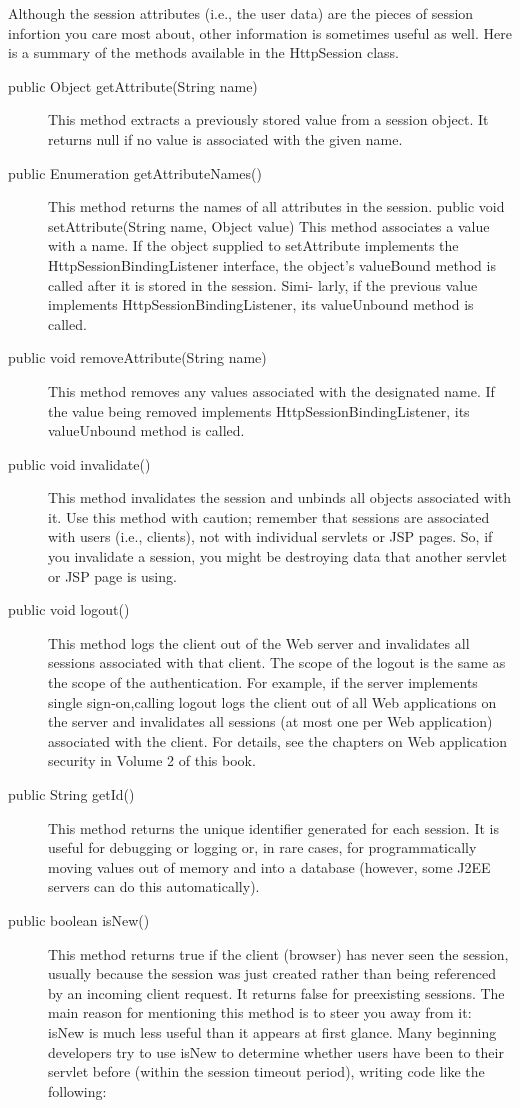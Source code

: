 \documentclass[a4paper,10pt]{scrreprt}
\begin{document}
{ Although the session attributes (i.e., the user data) are the pieces of session infortion you care most about, other
information is sometimes useful as well. Here is a summary of the methods available in the HttpSession class.
\begin{description}
\item[public Object getAttribute(String name)] This method extracts a previously stored value from a session object. It 
returns null if no value is associated with the
given name.
\item [public Enumeration getAttributeNames()]This method returns the names of all attributes in the session.
public void setAttribute(String name, Object value)
This method associates a value with a name. If the object supplied to setAttribute implements the
HttpSessionBindingListener interface, the object’s valueBound method is called after it is stored in the session.
Simi- larly, if the previous value implements HttpSessionBindingListener, its valueUnbound method is called.
\item[public void removeAttribute(String name)] This method removes any values associated with the designated name. If 
the value being removed implements HttpSessionBindingListener, its valueUnbound method is called.
\item[public void invalidate()] This method invalidates the session and unbinds all objects associated with it. Use this 
method with caution; remember that sessions are associated with users (i.e., clients), not with individual servlets or 
JSP pages. So, if you invalidate a session, you might be destroying data that another servlet or JSP page is using.
\item[public void logout()]This method logs the client out of the Web server and invalidates all sessions associated 
with that client. The scope of the logout is the same as the scope of the authentication. For example, if the server 
implements single sign-on,calling logout logs the client out of all Web applications on the server and invalidates all 
sessions (at most one per Web application) associated with the client. For details, see the chapters on Web application 
security in Volume 2 of this book.
\item[public String getId()] This method returns the unique identifier generated for each session. It is useful for 
debugging or logging or, in rare cases, for programmatically moving values out of memory and into a database (however, 
some J2EE servers can do this automatically).
\item[public boolean isNew()] This method returns true if the client (browser) has never seen the session, usually 
because the session was just created rather than being referenced by an incoming client request. It returns false for 
preexisting sessions. The main reason for mentioning this method is to steer you away from it: isNew is much less useful 
than it appears at first glance. Many beginning developers try to use isNew to determine whether users have been to 
their servlet before (within the session timeout period), writing code like the following:


\end{description}}
\end{document}
